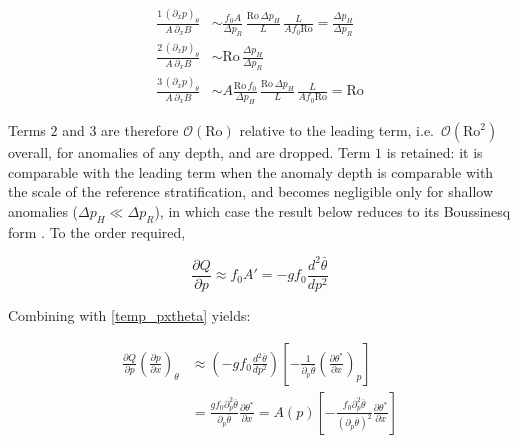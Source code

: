 \documentclass{article}
\begin{document}
\begin{equation}
\begin{aligned}
    \frac{\boxed{1} \, (\partial_x p)_\theta}{A\, \partial_x B} &\sim \frac{f_0 A}{\Delta p_R} \, \frac{\mathrm{Ro}\, \Delta p_H}{L} \, \frac{L}{A f_0 \mathrm{Ro}} = \frac{\Delta p_H}{\Delta p_R} \\
    \frac{\boxed{2} \, (\partial_x p)_\theta}{A\, \partial_x B} &\sim \mathrm{Ro}\, \frac{\Delta p_H}{\Delta p_R} \\
    \frac{\boxed{3} \, (\partial_x p)_\theta}{A\, \partial_x B} &\sim A \frac{\mathrm{Ro}\, f_0}{\Delta p_H} \, \frac{\mathrm{Ro}\, \Delta p_H}{L} \, \frac{L}{A f_0 \mathrm{Ro}} = \mathrm{Ro}
\end{aligned}
\end{equation}

Terms $\boxed{2}$ and $\boxed{3}$ are therefore $\mathcal{O}(\mathrm{Ro})$ relative to the leading term, i.e.\ $\mathcal{O}\left(\mathrm{Ro}^2\right)$ overall, for anomalies of any depth, and are dropped.
Term $\boxed{1}$ is retained: it is comparable with the leading term when the anomaly depth is comparable with the scale of the reference stratification, and becomes negligible only for shallow anomalies ($\Delta p_H \ll \Delta p_R$), in which case the result below reduces to its Boussinesq form \cite{Hoskins1985,HOLTON_chapter6}.
To the order required,

\begin{equation}\label{dQ_dp}
    \frac{\partial Q}{\partial p} \approx f_0 A' = -g f_0 \frac{d^2 \overline \theta}{dp^2}
\end{equation}

Combining with \cref{temp_pxtheta} yields:

\begin{equation}
\begin{aligned}
    \frac{\partial Q}{\partial p} \left(\frac{\partial p}{\partial x}\right)_\theta &\approx \left( -g f_0 \frac{d^2 \overline \theta}{dp^2}\right)\left[- \frac{1}{\partial_p \overline{\theta}} \left( \frac{\partial \theta^*}{\partial x}\right)_p \right] \\
    &= \frac{g f_0 \partial_p^2 \overline\theta}{\partial_p \overline\theta} \frac{\partial \theta ^*}{\partial x} = A(p) \left [-\frac{ f_0 \partial_p^2 \overline\theta}{\left(\partial_p \overline\theta\right)^2} \frac{\partial \theta ^*}{\partial x}\right]
\end{aligned}
\end{equation}
\end{document}
